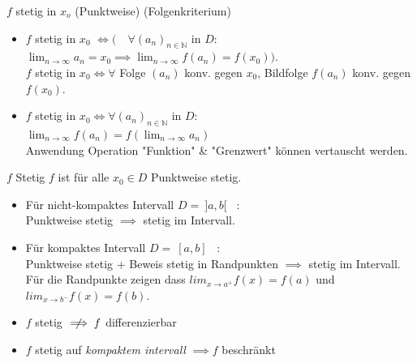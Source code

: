 \documentclass[a4paper]{article}
\newcommand\N{\ensuremath{\mathbb{N}}}
\newcommand\notimplies{\centernot\implies}
\begin{document}
\begin{mainbox}{$f$ stetig in $x_o$ (Punktweise) (Folgenkriterium)}
  \begin{itemize}[leftmargin=4.5mm, topsep=1pt, parsep=1pt]
    \item  $f$ stetig in $x_0$ $\iff (\quad \forall (a_n)_{n \in \N}$ in $D:$ \\ 
          \qquad \qquad $\lim_{n \to \infty} a_n = x_0 \implies \lim_{n \to \infty} f(a_n) = f(x_0))$. \\
          \tiny \color{gray} 
          $f$ stetig in $x_0 \Leftrightarrow \forall$ Folge $(a_n)$ konv. gegen $x_0$, Bildfolge $f(a_n)$ konv. gegen $f(x_0)$.
          \normalsize \color{black}
    \item $f$ stetig in $x_0 \iff \forall (a_n)_{n \in \N}$ in $D$: \\
          \qquad \qquad \qquad \qquad $\lim_{n \to \infty} f(a_n) = f( \lim_{n \to \infty} a_n)$ \\
            \tiny \color{gray}
              Anwendung Operation "Funktion" \& "Grenzwert" können vertauscht werden.
            \normalsize \color{black}
  \end{itemize}
\end{mainbox}

\begin{mainbox}{$f$ Stetig}
  $f$ ist für alle $x_0 \in D$ Punktweise stetig. \\
\end{mainbox}
\begin{itemize}[leftmargin=4.5mm, topsep=1pt, parsep=1pt]
  \item Für nicht-kompaktes Intervall $D = \ ]a,b[$ \ :  \\
        Punktweise stetig $\implies$ stetig im Intervall.
  \item Für kompaktes Intervall $D = \ [a,b]$ \ : \\
        Punktweise stetig + Beweis stetig in Randpunkten $\implies$ stetig im Intervall. 
        \tiny \color{gray}
            Für die Randpunkte zeigen dass $lim_{x \to a^+} f(x) = f(a)$ und $lim_{x \to b^-} f(x) = f(b)$.
        \normalsize \color{black}
  \item $f$ stetig $\notimplies f$ differenzierbar
  \item $f$ stetig auf \textit{kompaktem intervall} $\implies f$ beschränkt
\end{itemize}
\end{document}
